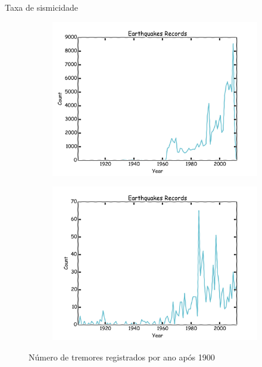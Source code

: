 \documentclass[ucs,8pt]{beamer}
\begin{document}
\begin{frame}{Taxa de sismicidade}
\begin{figure}[H]
	\centering
	\begin{subfigure}[t]{0.48\textwidth}
	  	\centering
		\includegraphics[width=1.0\textwidth]{hmtk_sa3_rate}
		\label{fig:sa_eq_record}
	\end{subfigure}%
	\quad %
	\begin{subfigure}[t]{0.48\textwidth}
	  	\centering
		\includegraphics[width=1.0\textwidth]{hmtk_bsb2013_rate}
		\label{fig:br_eq_record}
    \end{subfigure}%
	\caption{Número de tremores registrados por ano após 1900}
	\label{fig:eq_record}
\end{figure}
\end{frame}
\end{document}
